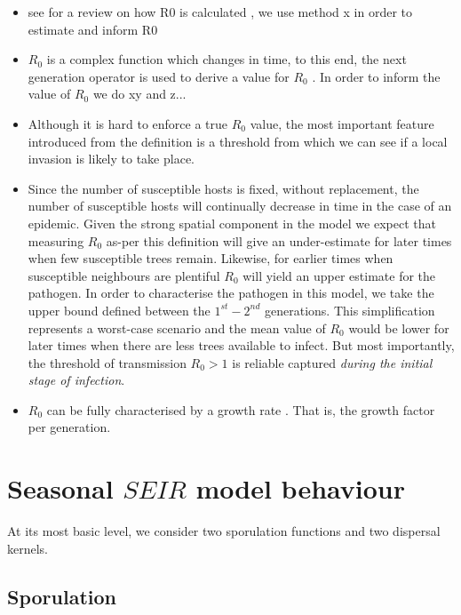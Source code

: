 \begin{itemize}
    \item see for a review on how R0 is calculated \cite{perspectives-on-r0}, we use method x in order to estimate and inform R0
    \item $R_0$ is a complex function which changes in time, to this end, the next generation operator is used to derive a value for $R_0$ \cite{doi:10.1098/rsif.2009.0386}. In order to inform the value of $R_0$ we do xy and z...
    \item Although it is hard to enforce a true $R_0$ value, the most important feature introduced from the definition is a threshold from which we can see if a local invasion is likely to take place.
    \item Since the number of susceptible hosts is fixed, without replacement, the number of susceptible hosts will continually decrease in time in the case of an epidemic. Given the strong spatial component in the model we expect that measuring $R_0$ as-per this definition will give an under-estimate for later times when few susceptible trees remain. Likewise, for earlier times when susceptible neighbours are plentiful $R_0$ will yield an upper estimate for the pathogen. In order to characterise the pathogen in this model, we take the upper bound defined between the $1^{st}-2^{nd}$ generations. This simplification represents a worst-case scenario and the mean value of $R_0$ would be lower for later times when there are less trees available to infect. But most importantly, the threshold of transmission $R_0>1$ is reliable captured \textit{during the initial stage of infection}.
    \item $R_0$ can be fully characterised by a growth rate \cite{R0-construct}. That is, the growth factor per generation.
    
\end{itemize}

\section{Seasonal $SEIR$ model behaviour}
At its most basic level, we consider two sporulation functions and two dispersal kernels. 

\subsection{Sporulation}

